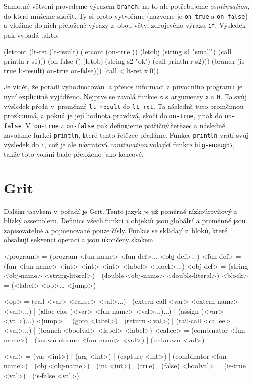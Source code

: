 Samotné větvení provedeme výrazem \texttt{branch}, na to ale potřebujeme
\emph{continuation}, do které můžeme skočit. Ty si proto vytvoříme (nazveme je 
\texttt{on-true} a \texttt{on-false}) a vložíme do nich přeložené výrazy z~obou
větví zdrojového výrazu \texttt{if}. Výsledek pak vypadá takto:

\begin{spine}
(letcont (lt-ret (lt-result)
            (letcont (on-true ()
                        (letobj (string s1 "small") (call println r s1)))
                     (on-false ()
                        (letobj (string s2 "ok") (call println r s2)))
              (branch (is-true lt-result) on-true on-false)))
  (call < lt-ret x 0))
\end{spine}

Je vidět, že pořadí vyhodnocování a přenos informací z~původního programu je
nyní explicitně vyjádřeno. Nejprve se zavolá funkce \texttt{<} s~argumenty
\texttt{x} a \texttt{0}. Ta svůj výsledek předá v~proměnné \texttt{lt-result} do
\texttt{lt-ret}. Ta následně tuto proměnnou prozkoumá, a pokud je její hodnota
pravdivá, skočí do \texttt{on-true}, jinak do \texttt{on-false}.
V~\texttt{on-true} a \texttt{on-false} pak definujeme patřičný řetězec a
následně zavoláme funkci \texttt{println}, které tento řetězec předáme. Funkce
\texttt{println} vrátí svůj výsledek do \texttt{r}, což je ale návratová
\emph{continuation} volající funkce \texttt{big-enough?}, takže toto volání bude
přeloženo jako koncové.

\section{Grit}

Dalším jazykem v~pořadí je Grit. Tento jazyk je již poměrně nízkoúrovňový a
blízký assembleru. Definice všech funkcí a objektů jsou globální a proměnné jsou
zapisovatelné a pojmenované pouze čísly. Funkce se skládají z~bloků, které
obsahují sekvenci operací a jsou ukončeny skokem.

\begin{gram}
<program>   = (program <fun-name> <fun-def>... <obj-def>...)
<fun-def>   = (fun <fun-name> <int> <int> <int> <label> <block>...)
<obj-def>   = (string <obj-name> <string-literal>)
            | (double <obj-name> <double-literal>)
<block>     = (<label> <op>... <jump>)

<op>        = (call <var> <callee> <val>...)
            | (extern-call <var> <extern-name> <val>...)
            | (alloc-clos (<var> <fun-name> <val>...)...)
            | (assign (<var> <val>)...)
<jump>      = (goto <label>)
            | (return <val>)
            | (tail-call <callee> <val>...)
            | (branch <boolval> <label> <label>)
<callee>    = (combinator <fun-name>)
            | (known-closure <fun-name> <val>)
            | (unknown <val>)

<val>       = (var <int>)
            | (arg <int>)
            | (capture <int>)
            | (combinator <fun-name>)
            | (obj <obj-name>)
            | (int <int>)
            | (true)
            | (false)
<boolval>   = (is-true <val>) | (is-false <val>)
\end{gram}

